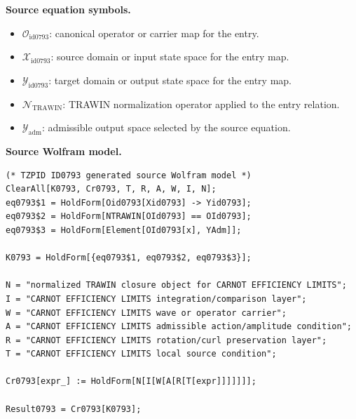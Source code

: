 \begin{minipage}[t]{0.49\linewidth}
\begingroup
\small
\raggedright
\textbf{Source equation symbols.}\par
\begin{itemize}[leftmargin=1.35em,itemsep=1pt,topsep=1pt,parsep=0pt]
    \item $\mathcal{O}_{\mathrm{id0793}}$: canonical operator or carrier map for the entry.
    \item $\mathcal{X}_{\mathrm{id0793}}$: source domain or input state space for the entry map.
    \item $\mathcal{Y}_{\mathrm{id0793}}$: target domain or output state space for the entry map.
    \item $\mathcal{N}_{\mathrm{TRAWIN}}$: TRAWIN normalization operator applied to the entry relation.
    \item $\mathcal{Y}_{\mathrm{adm}}$: admissible output space selected by the source equation.
\end{itemize}
\endgroup
\end{minipage}\hfill
\begin{minipage}[t]{0.47\linewidth}
\begingroup
\scriptsize
\raggedright
\textbf{Source Wolfram model.}\par
\begin{Verbatim}[fontsize=\tiny,breaklines=true,breakanywhere=true]
(* TZPID ID0793 generated source Wolfram model *)
ClearAll[K0793, Cr0793, T, R, A, W, I, N];
eq0793$1 = HoldForm[Oid0793[Xid0793] -> Yid0793];
eq0793$2 = HoldForm[NTRAWIN[OId0793] == OId0793];
eq0793$3 = HoldForm[Element[OId0793[x], YAdm]];

K0793 = HoldForm[{eq0793$1, eq0793$2, eq0793$3}];

N = "normalized TRAWIN closure object for CARNOT EFFICIENCY LIMITS";
I = "CARNOT EFFICIENCY LIMITS integration/comparison layer";
W = "CARNOT EFFICIENCY LIMITS wave or operator carrier";
A = "CARNOT EFFICIENCY LIMITS admissible action/amplitude condition";
R = "CARNOT EFFICIENCY LIMITS rotation/curl preservation layer";
T = "CARNOT EFFICIENCY LIMITS local source condition";

Cr0793[expr_] := HoldForm[N[I[W[A[R[T[expr]]]]]]];

Result0793 = Cr0793[K0793];
\end{Verbatim}
\endgroup
\end{minipage}

